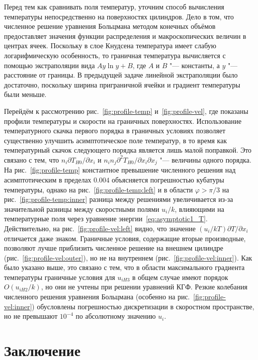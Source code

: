 \documentclass[
aps,%
12pt,%
final,%
notitlepage,%
oneside,%
onecolumn,%
nobibnotes,%
nofootinbib,%
superscriptaddress,%
noshowpacs,%
showkeys,%
floatfix,%
tightenlines,%
centertags]%
{revtex4}
\newcommand{\Pder}[2][]{\partial#1/\partial#2}
\newcommand{\Pderder}[3][]{\partial^2#1/\partial#2\partial#3}
\newcommand{\OO}[1]{O(#1)}
\begin{document}
Перед тем как сравнивать поля температур, уточним способ вычисления температуры
непосредственно на поверхностях цилиндров.
Дело в том, что численное решение уравнения Больцмана методом конечных объёмов
предоставляет значения функции распределения и макроскопических величин в центрах ячеек.
Поскольку в слое Кнудсена температура имеет слабую логарифмическую особенность,
то граничная температура вычисляется с помощью экстраполяции вида \(Ay\ln{y}+B\),
где \(A\) и \(B\) "--- константы, а \(y\) "--- расстояние от границы.
В предыдущей задаче линейной экстраполяции было достаточно,
поскольку ширина приграничной ячейки и градиент температуры были меньше.

Перейдём к рассмотрению рис.~\ref{fig:profile-temp} и~\ref{fig:profile-vel},
где показаны профили температуры и скорости на граничных поверхностях.
Использование температурного скачка первого порядка в граничных условиях
позволяет существенно улучшить асимптотическое поле температур,
в то время как температурный скачок следующего порядка является лишь малой поправкой.
Это связано с тем, что \(n_i\Pder[T_{H0}]{x_i}\) и \(n_in_j\Pderder[T_{H0}]{x_i}{x_j}\)
"--- величины одного порядка.
На рис.~\ref{fig:profile-temp} константное превышение численного решения над асимптотическим
в пределах \(0.004\) объясняется погрешностью кубатуры температуры,
однако на рис.~\ref{fig:profile-temp:left} и в области \(\varphi>\pi/3\) на рис.~\ref{fig:profile-temp:inner}
разница между решениями увеличивается из-за значительной разницы между скоростными полями \(u_i/k\),
влияющими на температурные поля через уравнение энергии~\eqref{eq:asymptotic1_T}.
Действительно, на рис.~\ref{fig:profile-vel:left} видно, что значение \((u_i/kT)\Pder[T]{x_i}\)
отличается даже знаком.
Граничные условия, содержащие вторые производные, позволяют лучше приблизить численное решение
на внешнем цилиндре (рис.~\ref{fig:profile-vel:outer}), но не на внутреннем (рис.~\ref{fig:profile-vel:inner}).
Как было указано выше, это связано с тем, что в области максимального градиента температуры
граничные условия для \(u_{iH3}\) в общем случае имеют порядок \(\OO{u_{iH2}/k}\),
но они не учтены при решении уравнений КГФ. Резкие колебания численного решения уравнения Больцмана
(особенно на рис.~\ref{fig:profile-vel:inner}) обусловлены погрешностью дискретизации в скоростном пространстве,
но не превышают \(10^{-4}\) по абсолютному значению \(u_i\).

\section{Заключение}
\end{document}
